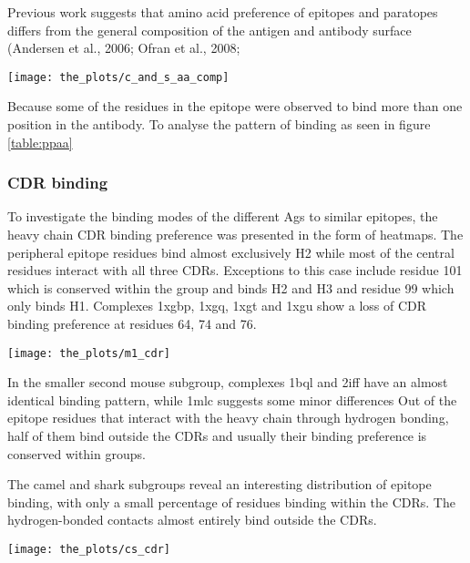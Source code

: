\documentclass{article}
\begin{document}
Previous work suggests that amino acid preference of epitopes and paratopes differs from
the general composition of the antigen and antibody surface (Andersen et al., 2006; Ofran et
al., 2008;

\begin{center}
	\texttt{[image: the\_plots/c\_and\_s\_aa\_comp]}
	 \label{pix:ppaa} %
\end{center}

Because some of the residues in the epitope were observed to bind more than one position in the antibody. To analyse the pattern of binding as seen in figure \ref{table:ppaa}

\subsubsection{CDR binding}

To investigate the binding modes of the different Ags to similar epitopes, the heavy chain CDR binding preference was presented in the form of heatmaps. The peripheral epitope residues bind almost exclusively H2 while most of the central residues interact with all three CDRs. Exceptions to this case include residue 101 which is conserved within the group and binds H2 and H3 and residue 99 which only binds H1. Complexes 1xgbp, 1xgq, 1xgt and 1xgu show a loss of CDR binding preference at residues 64, 74 and 76.
\begin{center}
	\texttt{[image: the\_plots/m1\_cdr]}
	 \label{pix:ppaa} %
\end{center}


In the smaller second mouse subgroup, complexes 1bql and 2iff have an almost identical binding pattern, while 1mlc suggests some minor differences  Out of the epitope residues that interact with the heavy chain through hydrogen bonding, half of them bind outside the CDRs and usually their binding preference is conserved within groups.

The camel and shark subgroups reveal an interesting distribution of epitope binding, with only a small percentage of residues binding within the CDRs. The hydrogen-bonded contacts almost entirely bind outside the CDRs.
\begin{center}
	\texttt{[image: the\_plots/cs\_cdr]}
	 \label{pix:ppaa} %
\end{center}
\end{document}
